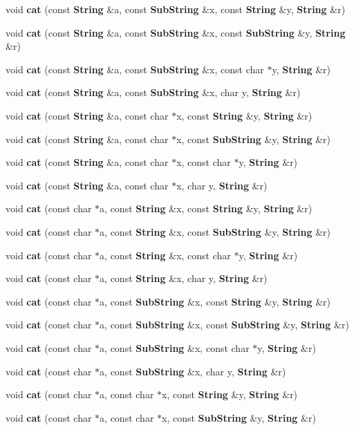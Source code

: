 \begin{CompactItemize}
\item 
void {\bf cat} (const {\bf String} \&a, const {\bf Sub\-String} \&x, const {\bf String} \&y, {\bf String} \&r)
\item 
void {\bf cat} (const {\bf String} \&a, const {\bf Sub\-String} \&x, const {\bf Sub\-String} \&y, {\bf String} \&r)
\item 
void {\bf cat} (const {\bf String} \&a, const {\bf Sub\-String} \&x, const char $\ast$y, {\bf String} \&r)
\item 
void {\bf cat} (const {\bf String} \&a, const {\bf Sub\-String} \&x, char y, {\bf String} \&r)
\item 
void {\bf cat} (const {\bf String} \&a, const char $\ast$x, const {\bf String} \&y, {\bf String} \&r)
\item 
void {\bf cat} (const {\bf String} \&a, const char $\ast$x, const {\bf Sub\-String} \&y, {\bf String} \&r)
\item 
void {\bf cat} (const {\bf String} \&a, const char $\ast$x, const char $\ast$y, {\bf String} \&r)
\item 
void {\bf cat} (const {\bf String} \&a, const char $\ast$x, char y, {\bf String} \&r)
\item 
void {\bf cat} (const char $\ast$a, const {\bf String} \&x, const {\bf String} \&y, {\bf String} \&r)
\item 
void {\bf cat} (const char $\ast$a, const {\bf String} \&x, const {\bf Sub\-String} \&y, {\bf String} \&r)
\item 
void {\bf cat} (const char $\ast$a, const {\bf String} \&x, const char $\ast$y, {\bf String} \&r)
\item 
void {\bf cat} (const char $\ast$a, const {\bf String} \&x, char y, {\bf String} \&r)
\item 
void {\bf cat} (const char $\ast$a, const {\bf Sub\-String} \&x, const {\bf String} \&y, {\bf String} \&r)
\item 
void {\bf cat} (const char $\ast$a, const {\bf Sub\-String} \&x, const {\bf Sub\-String} \&y, {\bf String} \&r)
\item 
void {\bf cat} (const char $\ast$a, const {\bf Sub\-String} \&x, const char $\ast$y, {\bf String} \&r)
\item 
void {\bf cat} (const char $\ast$a, const {\bf Sub\-String} \&x, char y, {\bf String} \&r)
\item 
void {\bf cat} (const char $\ast$a, const char $\ast$x, const {\bf String} \&y, {\bf String} \&r)
\item 
void {\bf cat} (const char $\ast$a, const char $\ast$x, const {\bf Sub\-String} \&y, {\bf String} \&r)

\end{CompactItemize}
